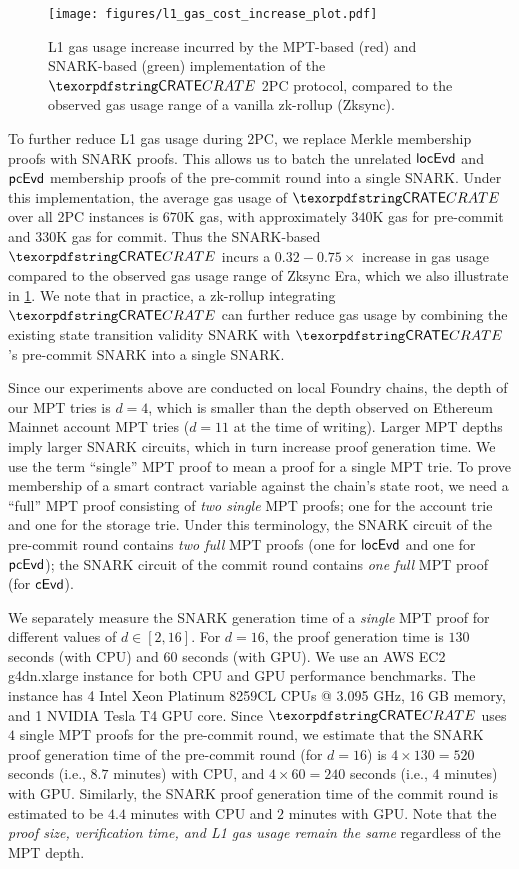 \begin{figure}
    \centering
    \texttt{[image: figures/l1\_gas\_cost\_increase\_plot.pdf]}
    \caption{L1 gas usage increase incurred by the MPT-based (red) and SNARK-based (green) implementation of the $\pname$ 2PC protocol, compared to the observed gas usage range of a vanilla zk-rollup (Zksync). }
    \label{fig:2pc-gas-usage-increase}
\end{figure}



 To further reduce L1 gas usage during 2PC, we replace Merkle membership proofs with SNARK proofs. This allows us to batch the unrelated $\mathsf{locEvd}$ and $\mathsf{pcEvd}$ membership proofs of the pre-commit round into a single SNARK. Under this implementation, the average gas usage of $\pname$ over all 2PC instances is $670$K gas, with approximately $340$K gas for pre-commit and $330$K gas for commit. Thus the SNARK-based $\pname$ incurs a $\mathbf{0.32-0.75}\times$ increase in gas usage compared to the observed gas usage range of Zksync Era, which we also illustrate in \cref{fig:2pc-gas-usage-increase}.
We note that in practice, a zk-rollup integrating $\pname$ can further reduce gas usage by combining the existing state transition validity SNARK with $\pname$'s pre-commit SNARK into a single SNARK. 


Since our experiments above are conducted on local Foundry chains, the depth of our MPT tries is $d = 4$, which is smaller than the depth observed on Ethereum Mainnet account MPT tries ($d=11$ at the time of writing). Larger MPT depths imply larger SNARK circuits, which in turn increase proof generation time. We use the term ``single'' MPT proof to mean a proof for a single MPT trie. To prove membership of a smart contract variable against the chain's state root, we need a ``full'' MPT proof consisting of \emph{two single} MPT proofs; one for the account trie and one for the storage trie. Under this terminology, the SNARK circuit of the pre-commit round contains \emph{two full} MPT proofs (one for $\mathsf{locEvd}$ and one for $\mathsf{pcEvd}$); the SNARK circuit of the commit round contains \emph{one full} MPT proof (for $\mathsf{cEvd}$).

We separately measure the SNARK generation time of a \emph{single} MPT proof for different values of $d \in [2,16]$. For $d=16$, the proof generation time is $130$ seconds (with CPU) and $60$ seconds (with GPU). We use an AWS EC2 g4dn.xlarge instance for both CPU and GPU performance benchmarks. The instance has 4 Intel Xeon Platinum 8259CL CPUs @ 3.095 GHz, 16 GB memory, and 1 NVIDIA Tesla T4 GPU core. Since $\pname$ uses $4$ single MPT proofs for the pre-commit round, we estimate that the SNARK proof generation time of the pre-commit round (for $d=16$) is $4 \times 130 = 520$ seconds (i.e., $8.7$ minutes) with CPU, and $4 \times 60 = 240$ seconds (i.e., $4$ minutes) with GPU. Similarly, the SNARK proof generation time of the commit round is estimated to be $4.4$ minutes with CPU and $2$ minutes with GPU. Note that the \emph{proof size, verification time, and L1 gas usage remain the same} regardless of the MPT depth.





